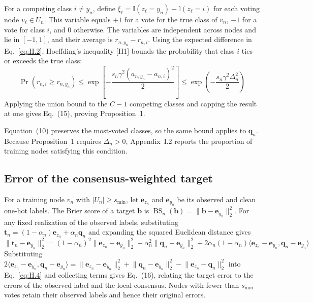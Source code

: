 \documentclass[10pt,letterpaper,nopreprintline]{elsarticle}
\begin{document}
For a competing class \(i\ne y_n\), define \(\xi_\ell=\mathbb I(z_\ell=y_n)-\mathbb I(z_\ell=i)\) for each voting node \(v_\ell\in U_n\). This variable equals \(+1\) for a vote for the true class of \(v_n\), \(-1\) for a vote for class \(i\), and 0 otherwise. The variables are independent across nodes and lie in \([-1,1]\), and their average is \(r_{n,y_n}-r_{n,i}\). Using the expected difference in Eq.~\eqref{eq:H.2}, Hoeffding's inequality [H1] bounds the probability that class \(i\) ties or exceeds the true class:
\begin{equation}\label{eq:H.3}
\Pr(r_{n,i}\geq r_{n,y_n})
\leq\exp\!\left[-\frac{s_n\gamma^2(a_{n,y_n}-a_{n,i})^2}{2}\right]
\leq\exp\!\left(-\frac{s_n\gamma^2\Delta_n^2}{2}\right)
\end{equation}
Applying the union bound to the \(C-1\) competing classes and capping the result at one gives Eq.~(15), proving Proposition~1.

Equation~(10) preserves the most-voted classes, so the same bound applies to \(\mathbf q_n\). Because Proposition~1 requires \(\Delta_n>0\), Appendix~I.2 reports the proportion of training nodes satisfying this condition.

\subsection{Error of the consensus-weighted target}\label{sec:H.2}

For a training node \(v_n\) with \(|U_n|\geq s_{\min}\), let \(\mathbf e_{z_n}\) and \(\mathbf e_{y_n}\) be its observed and clean one-hot labels. The Brier score of a target \(\mathbf b\) is \(\operatorname{BS}_n(\mathbf b)=\lVert\mathbf b-\mathbf e_{y_n}\rVert_2^2\). For any fixed realization of the observed labels, substituting \(\mathbf t_n=(1-\alpha_n)\mathbf e_{z_n}+\alpha_n\mathbf q_n\) and expanding the squared Euclidean distance gives
\begin{equation}\label{eq:H.4}
\lVert \mathbf t_n-\mathbf e_{y_n}\rVert_2^2=(1-\alpha_n)^2\lVert \mathbf e_{z_n}-\mathbf e_{y_n}\rVert_2^2+\alpha_n^2\lVert \mathbf q_n-\mathbf e_{y_n}\rVert_2^2
+2\alpha_n(1-\alpha_n)\langle \mathbf e_{z_n}-\mathbf e_{y_n},\mathbf q_n-\mathbf e_{y_n}\rangle
\end{equation}
Substituting \(2\langle \mathbf e_{z_n}-\mathbf e_{y_n},\mathbf q_n-\mathbf e_{y_n}\rangle=\lVert \mathbf e_{z_n}-\mathbf e_{y_n}\rVert_2^2+\lVert \mathbf q_n-\mathbf e_{y_n}\rVert_2^2-\lVert \mathbf e_{z_n}-\mathbf q_n\rVert_2^2\) into Eq.~\eqref{eq:H.4} and collecting terms gives Eq.~(16), relating the target error to the errors of the observed label and the local consensus. Nodes with fewer than \(s_{\min}\) votes retain their observed labels and hence their original errors.
\end{document}
